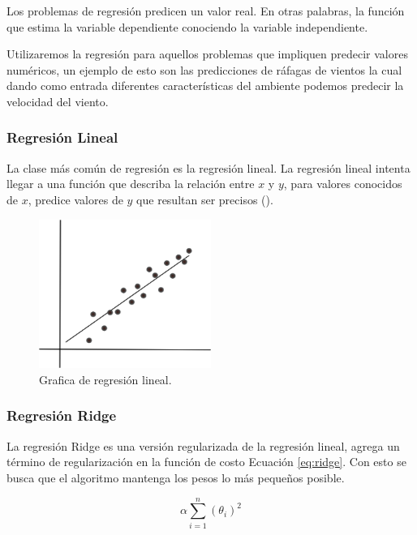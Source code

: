 Los problemas de regresión predicen un valor real. En otras palabras, la función que estima la variable dependiente conociendo la variable independiente.

Utilizaremos la regresión para aquellos problemas que impliquen predecir valores numéricos, un ejemplo de esto son las predicciones de ráfagas de vientos la cual dando como entrada diferentes características del ambiente podemos predecir la velocidad del viento.

\subsubsection{Regresión Lineal}

La clase más común de regresión es la regresión lineal. La regresión lineal intenta llegar a una función que describa la relación entre $x$ y $y$, para valores conocidos de $x$, predice valores de $y$ que resultan ser precisos (\cite{patterson2017deep}).

\begin{figure}[H]
    \centering
    \includegraphics[width=0.5\textwidth]{MarcoTeorico/imgs/RegresionLineal.png}
    \caption{Grafica de regresión lineal.}
    \label{fig:regresionLineal}
\end{figure}

\subsubsection{Regresión Ridge}

La regresión Ridge es una versión regularizada de la regresión lineal, agrega un término de regularización en la función de costo Ecuación \ref{eq:ridge}. Con esto se busca que el algoritmo mantenga los pesos lo más pequeños posible.

\begin{equation}
    \label{eq:ridge}
    \alpha \displaystyle\sum\limits_{i=1}^n (\theta_i)^{2}
\end{equation}

